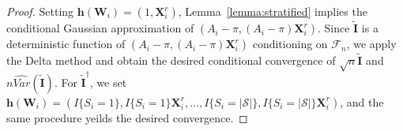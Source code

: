 \documentclass[12pt]{article}
\newcommand{\bX}{\boldsymbol{X}}
\newcommand{\bW}{\boldsymbol{W}}
\newcommand{\bI}{\boldsymbol{I}}
\newcommand{\bZ}{\boldsymbol{Z}}
\newcommand{\bh}{\boldsymbol{h}}
\newcommand{\tA}{\widetilde{A}}
\begin{document}
\begin{proof}
 Setting $\bh(\bW_i) = (1,\bX_i^r)$, Lemma~\ref{lemma:stratified} implies the conditional Gaussian approximation of  $(A_i-\pi,(A_i-\pi)\bX_i^r)$. Since $\widetilde{\bI}$ is a deterministic function of $(A_i-\pi,(A_i-\pi)\bX_i^r)$ conditioning on $\mathcal{F}_n$, we apply the Delta method and obtain the desired conditional convergence of $\sqrt{n}\widetilde{\bI}$ and $n\widehat{Var}(\widetilde{\bI})$. For $\widetilde{\bI}^{\dagger}$, we set $\bh(\bW_i) = (I\{S_i=1\}, I\{S_i=1\}\bX_i^r,\dots, I\{S_i=|\mathcal{S}|\}, I\{S_i=|\mathcal{S}|\}\bX_i^r)$, and the same procedure yeilds the desired convergence.
\end{proof}

\end{document}
